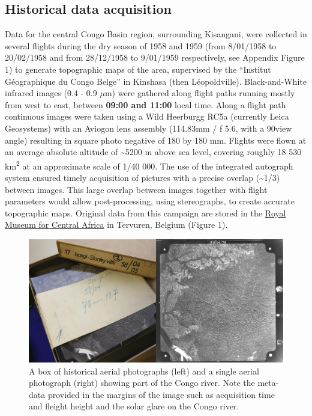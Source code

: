 \documentclass[remote sensing,article,submit,moreauthors,pdftex]{mdpi}
\begin{document}
\hypertarget{historical-data-acquisition}{%
\subsection{Historical data
acquisition}\label{historical-data-acquisition}}

Data for the central Congo Basin region, surrounding Kisangani, were
collected in several flights during the dry season of 1958 and 1959
(from 8/01/1958 to 20/02/1958 and from 28/12/1958 to 9/01/1959
respectively, see Appendix Figure 1) to generate topographic maps of the
area, supervised by the ``Institut Géographique du Congo Belge'' in
Kinshasa (then Léopoldville). Black-and-White infrared images (0.4 - 0.9
\(\mu\)m) were gathered along flight paths running mostly from west to
east, between \textbf{09:00 and 11:00} local time. Along a flight path
continuous images were taken using a Wild Heerburgg RC5a (currently
Leica Geosystems) with an Aviogon lens assembly (114.83mm / f 5.6, with
a 90\degree view angle) resulting in square photo negative of 180 by 180
mm. Flights were flown at an average absolute altitude of
\textasciitilde{}5200 m above sea level, covering roughly 18 530
km\textsuperscript{2} at an approximate scale of 1/40 000. The use of
the integrated autograph system ensured timely acquisition of pictures
with a precise overlap (\textasciitilde{}1/3) between images. This large
overlap between images together with flight parameters would allow
post-processing, using stereographs, to create accurate topographic
maps. Original data from this campaign are stored in the
\href{https://www.africamuseum.be/en}{Royal Museum for Central Africa}
in Tervuren, Belgium (Figure 1).

\begin{figure}

{\centering \includegraphics[width=0.75\linewidth]{./figures/print_examples} 

}

\caption{A box of historical aerial photographs (left) and a single aerial photograph (right) showing part of the Congo river. Note the meta-data provided in the margins of the image such as acquisition time and fleight height and the solar glare on the Congo river.}\label{fig:unnamed-chunk-1}
\end{figure}
\end{document}
